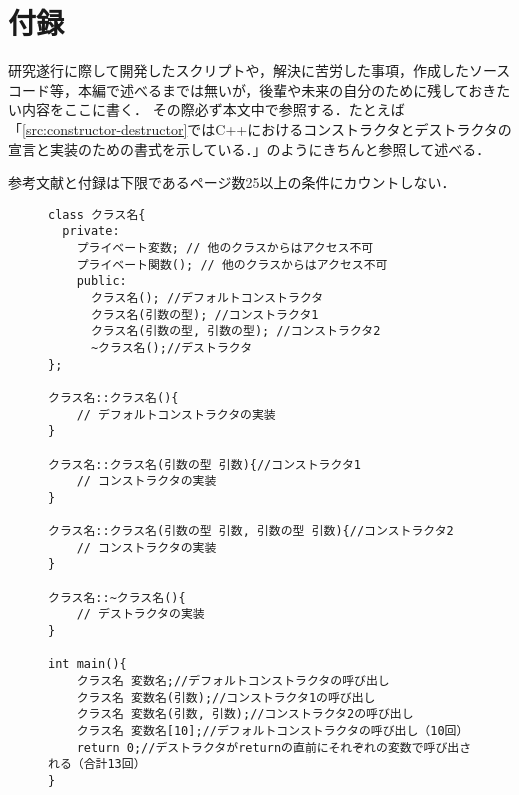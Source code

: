 
\section*{付録}

研究遂行に際して開発したスクリプトや，解決に苦労した事項，作成したソースコード等，本編で述べるまでは無いが，後輩や未来の自分のために残しておきたい内容をここに書く．
その際必ず本文中で参照する．たとえば「\autoref{src:constructor-destructor}ではC++におけるコンストラクタとデストラクタの宣言と実装のための書式を示している．」のようにきちんと参照して述べる．

参考文献と付録は下限であるページ数25以上の条件にカウントしない．



\begin{figure}[!tb]
	\begin{lstlisting}[caption=コンストラクタとデストラクタの書式, label=src:constructor-destructor, basicstyle=\ttfamily\scriptsize,escapechar=@]
class クラス名{
  private:
    プライベート変数; // 他のクラスからはアクセス不可
    プライベート関数(); // 他のクラスからはアクセス不可
	public:
	  クラス名(); //デフォルトコンストラクタ
	  クラス名(引数の型); //コンストラクタ1
	  クラス名(引数の型, 引数の型); //コンストラクタ2
	  ~クラス名();//デストラクタ
};

クラス名::クラス名(){
	// デフォルトコンストラクタの実装
}

クラス名::クラス名(引数の型 引数){//コンストラクタ1
	// コンストラクタの実装
}

クラス名::クラス名(引数の型 引数, 引数の型 引数){//コンストラクタ2
	// コンストラクタの実装
}

クラス名::~クラス名(){
	// デストラクタの実装
}

int main(){
	クラス名 変数名;//デフォルトコンストラクタの呼び出し
	クラス名 変数名(引数);//コンストラクタ1の呼び出し
	クラス名 変数名(引数, 引数);//コンストラクタ2の呼び出し
	クラス名 変数名[10];//デフォルトコンストラクタの呼び出し（10回）
	return 0;//デストラクタがreturnの直前にそれぞれの変数で呼び出される（合計13回）
}
	\end{lstlisting}
\end{figure}
